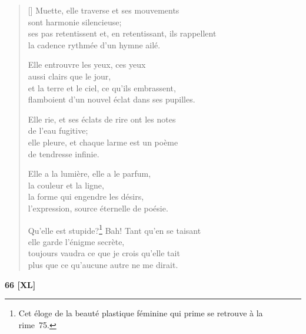 \documentclass[a4paper,12pt]{book}
\begin{document}
\begin{verse}[\versewidth]
  Muette, elle traverse et ses mouvements \\
  sont harmonie silencieuse; \\
  ses pas retentissent et, en retentissant, ils rappellent \\
  la cadence rythmée d'un hymne ailé.

  Elle entrouvre les yeux, ces yeux \\
  aussi clairs que le jour, \\
  et la terre et le ciel, ce qu'ils embrassent, \\
  flamboient d'un nouvel éclat dans ses pupilles.

  Elle rie, et ses éclats de rire ont les notes \\
  de l'eau fugitive; \\
  elle pleure, et chaque larme est un poème \\
  de tendresse infinie.

  Elle a la lumière, elle a le parfum, \\
  la couleur et la ligne, \\
  la forme qui engendre les désirs, \\
  l'expression, source éternelle de poésie.

  Qu'elle est stupide?\footnote{Cet éloge de la beauté plastique
  féminine qui prime se retrouve à la rime~75.} Bah!
  Tant qu'en se taisant \\
  elle garde l'énigme secrète, \\
  toujours vaudra ce que je crois qu'elle tait \\
  plus que ce qu'aucune autre ne me dirait.
\end{verse}

\bigskip

\begin{center}
  \textbf{66 [XL]}
\end{center}

\settowidth{\versewidth}{Sa main dans mes mains,}
\end{document}
